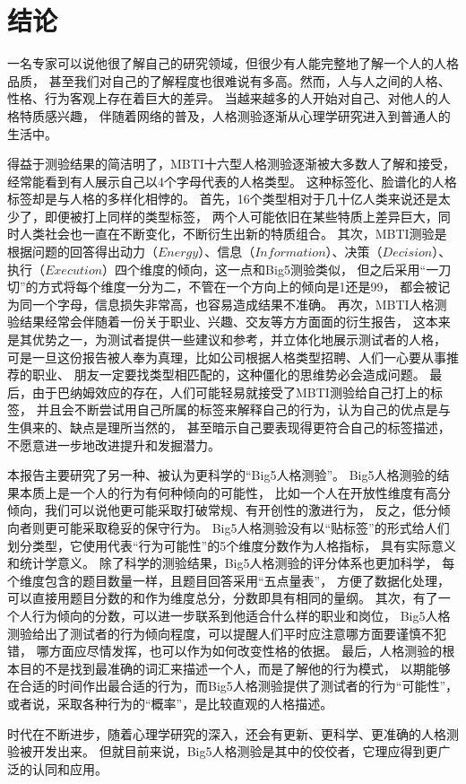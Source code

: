 \documentclass[UTF8]{ctexart}
\begin{document}
\part{结论}
一名专家可以说他很了解自己的研究领域，但很少有人能完整地了解一个人的人格品质，
甚至我们对自己的了解程度也很难说有多高。然而，人与人之间的人格、性格、行为客观上存在着巨大的差异。
当越来越多的人开始对自己、对他人的人格特质感兴趣，
伴随着网络的普及，人格测验逐渐从心理学研究进入到普通人的生活中。\par
得益于测验结果的简洁明了，MBTI十六型人格测验逐渐被大多数人了解和接受，
经常能看到有人展示自己以4个字母代表的人格类型。
这种标签化、脸谱化的人格标签却是与人格的多样化相悖的。
首先，16个类型相对于几十亿人类来说还是太少了，即便被打上同样的类型标签，
两个人可能依旧在某些特质上差异巨大，同时人类社会也一直在不断变化，不断衍生出新的特质组合。
其次，MBTI测验是根据问题的回答得出动力（$Energy$）、信息（$Information$）、决策（$Decision$）、
执行（$Execution$）四个维度的倾向，这一点和Big5测验类似，
但之后采用“一刀切”的方式将每个维度一分为二，不管在一个方向上的倾向是1还是99，
都会被记为同一个字母，信息损失非常高，也容易造成结果不准确。
再次，MBTI人格测验结果经常会伴随着一份关于职业、兴趣、交友等方方面面的衍生报告，
这本来是其优势之一，为测试者提供一些建议和参考，并立体化地展示测试者的人格，
可是一旦这份报告被人奉为真理，比如公司根据人格类型招聘、人们一心要从事推荐的职业、
朋友一定要找类型相匹配的，这种僵化的思维势必会造成问题。
最后，由于巴纳姆效应的存在，人们可能轻易就接受了MBTI测验给自己打上的标签，
并且会不断尝试用自己所属的标签来解释自己的行为，认为自己的优点是与生俱来的、缺点是理所当然的，
甚至暗示自己要表现得更符合自己的标签描述，不愿意进一步地改进提升和发掘潜力。\par
本报告主要研究了另一种、被认为更科学的“Big5人格测验”。
Big5人格测验的结果本质上是一个人的行为有何种倾向的可能性，
比如一个人在开放性维度有高分倾向，我们可以说他更可能采取打破常规、有开创性的激进行为，
反之，低分倾向者则更可能采取稳妥的保守行为。
Big5人格测验没有以“贴标签”的形式给人们划分类型，它使用代表“行为可能性”的5个维度分数作为人格指标，
具有实际意义和统计学意义。
除了科学的测验结果，Big5人格测验的评分体系也更加科学，
每个维度包含的题目数量一样，且题目回答采用“五点量表”，
方便了数据化处理，可以直接用题目分数的和作为维度总分，分数即具有相同的量纲。
其次，有了一个人行为倾向的分数，可以进一步联系到他适合什么样的职业和岗位，
Big5人格测验给出了测试者的行为倾向程度，可以提醒人们平时应注意哪方面要谨慎不犯错，
哪方面应尽情发挥，也可以作为如何改变性格的依据。
最后，人格测验的根本目的不是找到最准确的词汇来描述一个人，而是了解他的行为模式，
以期能够在合适的时间作出最合适的行为，而Big5人格测验提供了测试者的行为“可能性”，
或者说，采取各种行为的“概率”，是比较直观的人格描述。\par
时代在不断进步，随着心理学研究的深入，还会有更新、更科学、更准确的人格测验被开发出来。
但就目前来说，Big5人格测验是其中的佼佼者，它理应得到更广泛的认同和应用。
\end{document}
